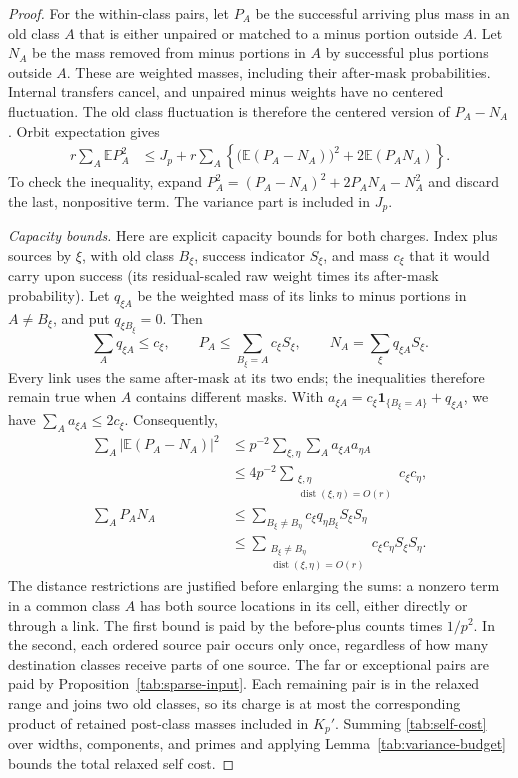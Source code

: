 \begin{proof}
For the within-class pairs, let $P_A$ be the successful arriving
plus mass in an old class $A$ that is either unpaired or matched
to a minus portion outside $A$.  Let $N_A$ be the mass removed
from minus portions in $A$ by successful plus portions outside
$A$.  These are weighted masses, including their after-mask
probabilities.  Internal transfers cancel, and unpaired minus
weights have no centered fluctuation.  The old class fluctuation
is therefore the centered version of $P_A-N_A$.  Orbit
expectation gives
\begin{align}
 r\sum_A\mathbb E P_A^2
 &\le J_p+
 r\sum_A\left\{\bigl(\mathbb E(P_A-N_A)\bigr)^2
                    +2\mathbb E(P_AN_A)\right\}.
 \label{tab:self-cost}
\end{align}
To check the inequality, expand
$P_A^2=(P_A-N_A)^2+2P_AN_A-N_A^2$ and discard the last,
nonpositive term.  The variance part is included in $J_p$.

\emph{Capacity bounds.}\quad
Here are explicit capacity bounds for both charges.  Index plus
sources by $\xi$, with old class $B_\xi$, success indicator
$S_\xi$, and mass $c_\xi$ that it would carry upon success
(its residual-scaled raw weight times its after-mask probability).
Let $q_{\xi A}$ be the weighted mass of its links to minus
portions in $A\ne B_\xi$, and put $q_{\xi B_\xi}=0$.  Then
\[
 \sum_Aq_{\xi A}\le c_\xi,\qquad
 P_A\le\sum_{B_\xi=A}c_\xi S_\xi,
 \qquad N_A=\sum_\xi q_{\xi A}S_\xi.
\]
Every link uses the same after-mask at its two ends; the
inequalities therefore remain true when $A$ contains different
masks.  With
$a_{\xi A}=c_\xi\mathbf1_{\{B_\xi=A\}}+q_{\xi A}$,
we have $\sum_Aa_{\xi A}\le2c_\xi$.  Consequently,
\begin{align*}
 \sum_A\bigl|\mathbb E(P_A-N_A)\bigr|^2
 &\le p^{-2}\sum_{\xi,\eta}\sum_Aa_{\xi A}a_{\eta A}\\
 &\le 4p^{-2}\sum_{\substack{\xi,\eta\\
                  \operatorname{dist}(\xi,\eta)=O(r)}}c_\xi c_\eta,\\
 \sum_AP_AN_A
 &\le\sum_{B_\xi\ne B_\eta}
       c_\xi q_{\eta B_\xi}S_\xi S_\eta\\
 &\le\sum_{\substack{B_\xi\ne B_\eta\\
                  \operatorname{dist}(\xi,\eta)=O(r)}}
       c_\xi c_\eta S_\xi S_\eta.
\end{align*}
The distance restrictions are justified before enlarging the
sums: a nonzero term in a common class $A$ has both source
locations in its cell, either directly or through a link.
The first bound is paid by the before-plus counts times
$1/p^2$.  In the second, each ordered source pair occurs only
once, regardless of how many destination classes receive parts
of one source.  The far or exceptional pairs are paid by
Proposition~\ref{tab:sparse-input}.  Each remaining pair is in
the relaxed range and joins two old classes, so its charge is
at most the corresponding product of retained post-class masses
included in $K_p'$.  Summing \eqref{tab:self-cost} over widths,
components, and primes and applying
Lemma~\ref{tab:variance-budget} bounds the total relaxed self cost.


\end{proof}
